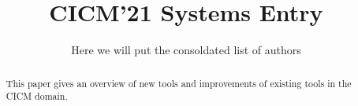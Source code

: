 \documentclass{llncs}
\title{CICM'21 Systems Entry}
\author{Here we will put the consoldated list of authors}
\institute{And here the consolidated list of institutes}
\begin{document}
\maketitle



\begin{abstract}
This paper gives an overview of new tools and improvements of existing tools in the CICM domain.
\end{abstract}

\newpage



\newpage



\end{document}
